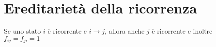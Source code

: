 \documentclass[\main/main.tex]{subfiles}
\begin{document}
\section{Ereditarietà della ricorrenza}
\begin{theorem}
  Se uno stato \(i\) è ricorrente e \(i\rightarrow j\), allora anche \(j\) è ricorrente e inoltre \(f_{ij} = f_{ji} = 1\)
\end{theorem}
\end{document}

